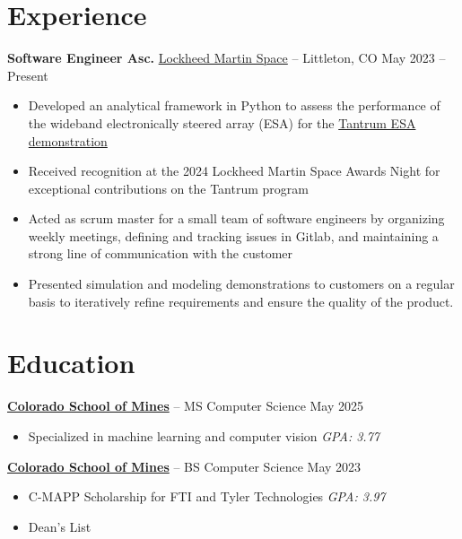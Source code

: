 \documentclass[11pt]{article}       %
\begin{document}
\section*{Experience}
\textbf{Software Engineer Asc.} \href{https://www.lockheedmartin.com/en-us/capabilities/space.html}{Lockheed Martin Space}
-- Littleton, CO \hfill May 2023 -- Present \\
\vspace{-9pt}
\begin{itemize}
  \item Developed an analytical framework in Python to assess the performance of
        the wideband electronically steered array (ESA) for the
        \href{https://news.lockheedmartin.com/ESA_payload_demonstrator}{Tantrum ESA demonstration}
  \item Received recognition at the 2024 Lockheed Martin Space Awards Night for
        exceptional contributions on the Tantrum program
  \item Acted as scrum master for a small team of software engineers by
        organizing weekly meetings, defining and tracking issues in Gitlab, and
        maintaining a strong line of communication with the customer
  \item Presented simulation and modeling demonstrations to customers on a
        regular basis to iteratively refine requirements and ensure the quality
        of the product.
\end{itemize}

\vspace{-18.5pt}

\section*{Education}
\textbf{\href{https://cs.mines.edu}{Colorado School of Mines}} -- MS Computer Science \hfill May 2025 \\
\vspace{-11.5pt}
\begin{itemize}
  \itemsep -0.5em
  \item Specialized in machine learning and computer vision \hfill \textit{GPA: 3.77}
\end{itemize}

\vspace{-6.5pt}

\textbf{\href{https://cs.mines.edu}{Colorado School of Mines}} -- BS Computer Science \hfill May 2023 \\
\vspace{-11.5pt}
\begin{itemize}
  \itemsep -0.5em
  \item C-MAPP Scholarship for FTI and Tyler Technologies \hfill \textit{GPA: 3.97}
  \item Dean's List \hfill
\end{itemize}
\end{document}
